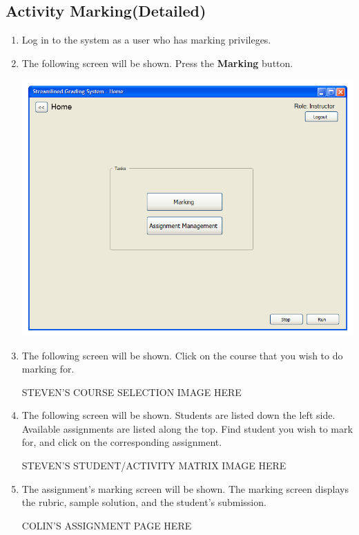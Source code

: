 \documentclass{article}
\begin{document}
\subsection{Activity Marking(Detailed)}
\begin{enumerate}
  \item Log in to the system as a user who has marking privileges.
  \item The following screen will be shown.  Press the \textbf{Marking} button.
  \begin{center} 
   \includegraphics[scale=0.6]{../images/UIMockups/PNG_Renders/LandingPage}
  \end{center}
  \item The following screen will be shown.  Click on the course that you wish to do marking for.
    \begin{center} 
   STEVEN'S COURSE SELECTION IMAGE HERE
    \end{center}
  \item The following screen will be shown.  Students are listed down the left side.  Available assignments are listed along the top.  Find student you wish to mark for, and click on the corresponding assignment.
  \begin{center} 
   STEVEN'S STUDENT/ACTIVITY MATRIX IMAGE HERE
    \end{center}
  \item The assignment's marking screen will be shown.  The marking screen displays the rubric, sample solution, and the student's submission. 
  \begin{center} 
   COLIN'S ASSIGNMENT PAGE HERE

\end{center}
\end{enumerate}
\end{document}
